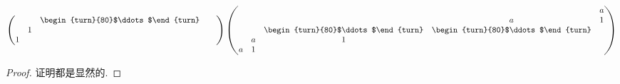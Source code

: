 \documentclass[../../main.tex]{subfiles}%
\begin{document}
\begin{lemma}
\begin{align*}
\begin{pmatrix}
& & \begin{turn}{80}$\ddots$\end{turn} & & \\
& 1 & & & \\
1 & & & &
\end{pmatrix}
\begin{pmatrix}
& & & & a \\
& & & a & 1 \\
& & \begin{turn}{80}$\ddots$\end{turn} & \begin{turn}{80}$\ddots$\end{turn} & \\
& a & 1 & & \\
a & 1 & & &
\end{pmatrix}
\end{align*}
\end{lemma}
\begin{proof}

证明都是显然的.

\end{proof}
\end{document}
